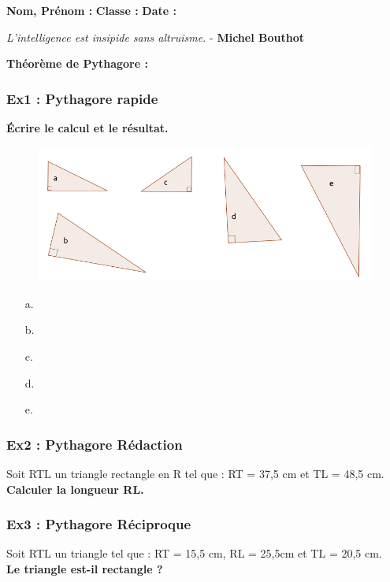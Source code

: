 



\textbf{Nom, Prénom :} \hspace{8cm} \textbf{Classe :} \hspace{3cm} \textbf{Date :}\\

\vspace{-0.5cm} \begin{center}
  \textit{L'intelligence est insipide sans altruisme.}  - \textbf{Michel Bouthot}
\end{center}

\textbf{Théorème de Pythagore : } \dotfill \\
\Pointilles[1]

\subsubsection*{Ex1 : Pythagore rapide}
\textbf{Écrire le calcul et le résultat.}
  
\begin{figure}[H]
  \centering
  \includegraphics[width=0.6\linewidth]{4x8-pythagore-2/ex2.png}
\end{figure}

  \begin{enumerate}
  \item[a.] \dotfill 
  \item[b.] \dotfill 
  \item[c.] \dotfill 
  \item[d.] \dotfill 
  \item[e.] \dotfill 
  \end{enumerate}


\begin{multicols}{2}

  \subsubsection*{Ex2 : Pythagore Rédaction}

  Soit RTL un triangle rectangle en R tel que : RT = 37,5 cm et TL = 48,5 cm. \\
  \textbf{Calculer la longueur RL.}

  \Pointilles[16] \columnbreak

  \subsubsection*{Ex3 : Pythagore Réciproque}

  Soit RTL un triangle tel que : RT = 15,5 cm, RL = 25,5cm et TL = 20,5 cm. \\
  \textbf{Le triangle est-il rectangle ?}

\Pointilles[16]

\end{multicols}

